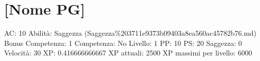 \section{{[}Nome PG{]}}\label{nome-pg}

AC: 10 Abilità: Saggezza
(Saggezza\%203711e9373b09403a8ea560ac45782b76.md) Bonus Competenza: 1
Competenza: No Livello: 1 PP: 10 PS: 20 Saggezza: 0 Velocità: 30 XP:
0.416666666667 XP attuali: 2500 XP massimi per livello: 6000
